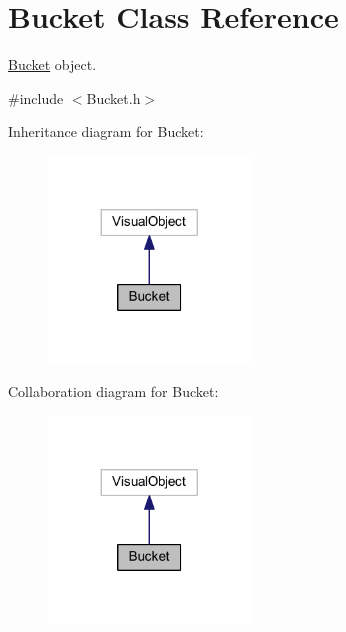 \hypertarget{class_bucket}{}\section{Bucket Class Reference}
\label{class_bucket}


\mbox{\hyperlink{class_bucket}{Bucket}} object.  




{\ttfamily \#include $<$Bucket.\+h$>$}



Inheritance diagram for Bucket\+:
\nopagebreak
\begin{figure}[H]
\begin{center}
\leavevmode
\includegraphics[width=152pt]{class_bucket__inherit__graph}
\end{center}
\end{figure}


Collaboration diagram for Bucket\+:
\nopagebreak
\begin{figure}[H]
\begin{center}
\leavevmode
\includegraphics[width=152pt]{class_bucket__coll__graph}
\end{center}
\end{figure}
